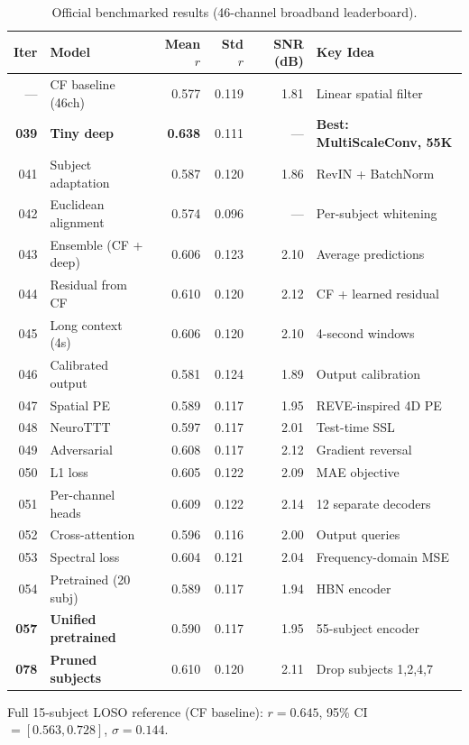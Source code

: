 \documentclass[11pt,a4paper]{article}
\begin{document}
\begin{table}[H]
\centering
\small
\caption{Official benchmarked results (46-channel broadband leaderboard).}
\begin{tabular}{rlrrrl}
\toprule
Iter & Model & Mean $r$ & Std $r$ & SNR (dB) & Key Idea \\
\midrule
--- & CF baseline (46ch) & 0.577 & 0.119 & 1.81 & Linear spatial filter \\
\textbf{039} & \textbf{Tiny deep} & \textcolor{good}{\textbf{0.638}} & 0.111 & --- & \textbf{Best: MultiScaleConv, 55K} \\
\midrule
041 & Subject adaptation & 0.587 & 0.120 & 1.86 & RevIN + BatchNorm \\
042 & Euclidean alignment & 0.574 & 0.096 & --- & Per-subject whitening \\
043 & Ensemble (CF + deep) & 0.606 & 0.123 & 2.10 & Average predictions \\
044 & Residual from CF & 0.610 & 0.120 & 2.12 & CF + learned residual \\
045 & Long context (4s) & 0.606 & 0.120 & 2.10 & 4-second windows \\
046 & Calibrated output & 0.581 & 0.124 & 1.89 & Output calibration \\
047 & Spatial PE & 0.589 & 0.117 & 1.95 & REVE-inspired 4D PE \\
048 & NeuroTTT & 0.597 & 0.117 & 2.01 & Test-time SSL \\
049 & Adversarial & 0.608 & 0.117 & 2.12 & Gradient reversal \\
050 & L1 loss & 0.605 & 0.122 & 2.09 & MAE objective \\
051 & Per-channel heads & 0.609 & 0.122 & 2.14 & 12 separate decoders \\
052 & Cross-attention & 0.596 & 0.116 & 2.00 & Output queries \\
053 & Spectral loss & 0.604 & 0.121 & 2.04 & Frequency-domain MSE \\
054 & Pretrained (20 subj) & 0.589 & 0.117 & 1.94 & HBN encoder \\
\textbf{057} & \textbf{Unified pretrained} & 0.590 & 0.117 & 1.95 & 55-subject encoder \\
\textbf{078} & \textbf{Pruned subjects} & 0.610 & 0.120 & 2.11 & Drop subjects 1,2,4,7 \\
\bottomrule
\end{tabular}
\end{table}

Full 15-subject LOSO reference (CF baseline): $r = 0.645$,
95\% CI $= [0.563, 0.728]$, $\sigma = 0.144$.
\end{document}
